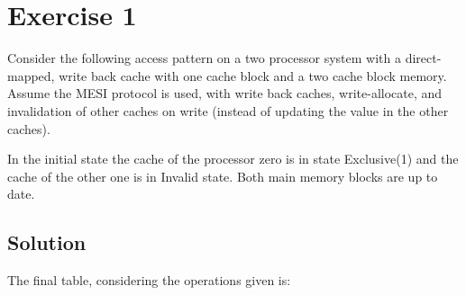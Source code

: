 \section{Exercise 1}

Consider the following access pattern on a two processor system with a direct-mapped, write back cache with one cache block and a two cache block memory.
Assume the MESI protocol is used, with write back caches, write-allocate, and invalidation of other caches on write (instead of updating the value in the other caches).

In the initial state the cache of the processor zero is in state Exclusive(1) and the cache of the other one is in Invalid state. 
Both main memory blocks are up to date. 

\subsection*{Solution}
The final table, considering the operations given is: 
